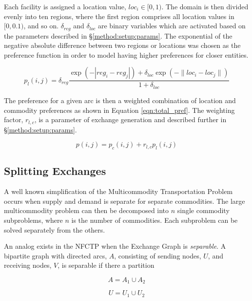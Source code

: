 Each facility is assigned a location value, $loc_i \in [0, 1)$. The domain is
  then divided evenly into ten regions, where the first region comprises all
  location values in $[0, 0.1)$, and so on. $\delta_{reg}$ and $\delta_{loc}$
    are binary variables which are activated based on the parameters described
    in \S \ref{method:setup:params}. The exponential of the negative absolute
    difference between two regions or locations was chosen as the preference
    function in order to model having higher preferences for closer entities.

\begin{equation}\label{eqn:loc_proxy}
p_{l}(i, j) = \delta_{reg} \frac{\exp(- | reg_{i} - reg_{j} | ) + \delta_{loc}
  \exp(- \| loc_{i} - loc_{j} \| )}{1 + \delta_{loc}}
\end{equation}

The preference for a given arc is then a weighted combination of location and
commodity preferences as shown in Equation \ref{eqn:total_pref}. The weighting
factor, $r_{l, c}$, is a parameter of exchange generation and described further
in \S \ref{method:setup:params}.

\begin{equation}\label{eqn:total_pref}
p(i, j) = p_{c}(i, j) + r_{l, c} p_{l}(i, j)
\end{equation}

\subsection{Splitting Exchanges}\label{method:setup:split}

A well known simplification of the Multicommodity Transportation Problem occurs
when supply and demand is separate for separate commodities. The large
multicommodity problem can then be decomposed into $n$ single commodity
subproblems, where $n$ is the number of commodities. Each subproblem can be
solved separately from the others.

An analog exists in the NFCTP when the Exchange Graph is \textit{separable}. A
bipartite graph with directed arcs, $A$, consisting of sending nodes, $U$, and
receiving nodes, $V$, is separable if there a partition

\begin{equation}
  A = A_{1} \cup A_{2}
\end{equation}

\begin{equation}
  U = U_{1} \cup U_{2}
\end{equation}

